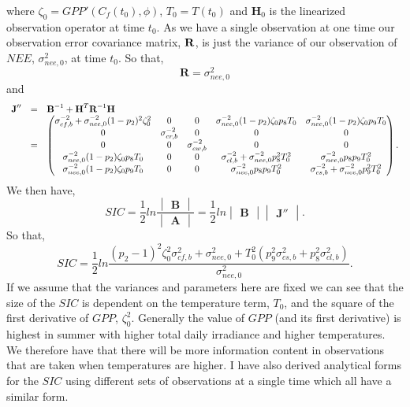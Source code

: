 \documentclass[11pt]{article}
\begin{document}
where $\zeta_0 = GPP'(C_f(t_0), \phi)$, $T_{0}=T(t_0)$ and $\textbf{H}_{0}$ is the linearized observation operator at time $t_0$. As we have a single observation at one time our observation error covariance matrix, $\bf{R}$, is just the variance of our observation of $NEE$, $\sigma_{nee,0}^{2}$, at time $t_0$. So that,
\[
\textbf{R}=\sigma_{nee,0}^{2}
\]  
and
\[
\begin{array} {lcl}
\textbf{J}'' &=& \textbf{B}^{-1}+\textbf{H}^{T}\textbf{R}^{-1}\bf{H} \\
&=& \begin{pmatrix} 
\sigma_{cf,b}^{-2}+\sigma_{nee,0}^{-2}(1-p_{2})^{2}\zeta_0^{2} & 0 & 0 & \sigma_{nee,0}^{-2}(1-p_{2})\zeta_0 p_{8}T_0 & \sigma_{nee,0}^{-2}(1-p_{2})\zeta_0 p_{9}T_0 \\
0 & \sigma_{cr,b}^{-2} & 0 & 0 & 0 \\
0 & 0 & \sigma_{cw,b}^{-2} & 0 & 0 \\
\sigma_{nee,0}^{-2}(1-p_{2})\zeta_0 p_{8}T_0 & 0 & 0 & \sigma_{cl,b}^{-2}+\sigma_{nee,0}^{-2}p_{8}^2 T_0^2 & \sigma_{nee,0}^{-2}p_{8}p_{9} T_0^2 \\
\sigma_{nee,0}^{-2}(1-p_{2})\zeta_0 p_{9}T_0 & 0 & 0 & \sigma_{nee,0}^{-2}p_{8}p_{9} T_0^2 & \sigma_{cs,b}^{-2}+\sigma_{nee,0}^{-2}p_{9}^2 T_0^2 \\
\end{pmatrix}.
\end{array}
\] 
We then have,
\[
SIC=\frac{1}{2}ln\frac{\begin{vmatrix} \textbf{B} \end{vmatrix}}{\begin{vmatrix} \textbf{A} \end{vmatrix}} = \frac{1}{2}ln\begin{vmatrix} \textbf{B} \end{vmatrix}\begin{vmatrix} \textbf{J}'' \end{vmatrix}.
\]
So that,
\[
SIC = \frac{1}{2}ln\frac{(p_{2}-1)^{2}\zeta_0^{2}\sigma_{cf,b}^{2}+\sigma_{nee,0}^{2}+T_{0}^2(p_{9}^2\sigma_{cs,b}^2+p_8^2\sigma_{cl,b}^2)}{\sigma_{nee,0}^{2}}.
\]
If we assume that the variances and parameters here are fixed we can see that the size of the $SIC$ is dependent on the temperature term, $T_0$, and the square of the first derivative of $GPP$, $\zeta_0^{2}$. Generally the value of $GPP$ (and its first derivative) is highest in summer with higher total daily irradiance and higher temperatures. We therefore have that there will be more information content in observations that are taken when temperatures are higher. I have also derived analytical forms for the $SIC$ using different sets of observations at a single time which all have a similar form.
\end{document}
